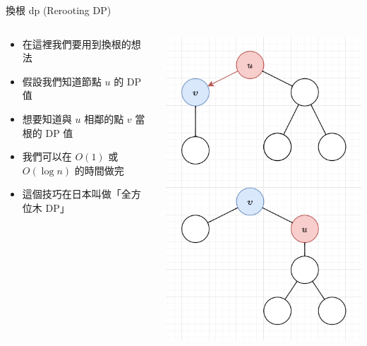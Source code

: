 \documentclass[aspectratio=169]{beamer}
\begin{document}
    
    \begin{frame}{換根 dp (Rerooting DP)}
        \begin{columns}
            \begin{column}{0.6 \textwidth}
                \begin{itemize}
                    \item 在這裡我們要用到換根的想法
                    \item 假設我們知道節點 $u$ 的 DP 值
                    \item 想要知道與 $u$ 相鄰的點 $v$ 當根的 DP 值
                    \item 我們可以在 $O(1)$ 或 $O(\log n)$ 的時間做完
                    \item 這個技巧在日本叫做「全方位木 DP」
                \end{itemize}
            \end{column}
            \begin{column}{0.4 \textwidth}
                \begin{center}
                    \includegraphics[scale=0.35]{images/reroot.png}
                \end{center}
            \end{column}
        \end{columns}
    \end{frame}
    
\end{document}
